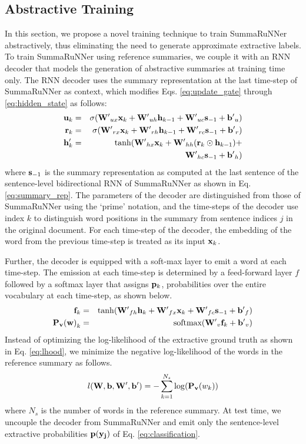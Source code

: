 \documentclass[letterpaper]{article}
\begin{document}
\subsection{\bf Abstractive Training}\label{sec:abstractive_training}
In this section, we propose a novel training technique to train SummaRuNNer abstractively, thus eliminating the need to generate approximate extractive labels. To train SummaRuNNer using reference summaries, we couple it with an RNN decoder that models the generation of abstractive summaries at training time only. The RNN decoder uses the summary representation at the last time-step of SummaRuNNer as context, which modifies Eqs. \ref{eq:update_gate} through \ref{eq:hidden_state} as follows:
\begin{eqnarray}
{\bf u}_k &=&  \sigma({\bf W'}_{ux}{\bf x}_k + {\bf W'}_{uh} {\bf h}_{k-1} + {\bf W'}_{uc}{\bf s}_{-1} + {\bf b'}_u) \nonumber\\
{\bf r}_k &=&  \sigma({\bf W'}_{rx}{\bf x}_k + {\bf W'}_{rh} {\bf h}_{k-1} + {\bf W'}_{rc}{\bf s}_{-1} + {\bf b'}_r) \nonumber\\
{\bf h}'_k &=& \tanh({\bf W'}_{hx}{\bf x}_k + {\bf W'}_{hh} ({\bf r}_k \odot {\bf h}_{k-1}) + \nonumber\\
 && {\bf W'}_{hc}{\bf s}_{-1} + {\bf b'}_h)\nonumber
\end{eqnarray}
where ${\bf s}_{-1}$ is the summary representation as computed at the last sentence of the sentence-level bidirectional RNN of SummaRuNNer as shown in Eq. \ref{eq:summary_rep}. The parameters of the decoder are distinguished from those of SummaRuNNer using the `prime' notation, and the time-steps of the decoder use index $k$ to distinguish word positions in the summary from sentence indices $j$ in the original document. For each time-step of the decoder, the embedding of the word from the previous time-step is treated as its input ${\bf x}_k$.

Further, the decoder is equipped with a soft-max layer to emit a word at each time-step. The emission at each time-step is determined by a feed-forward layer $f$ followed by a softmax layer that assigns ${\bf p}_k$, probabilities over the entire vocabulary at each time-step, as shown below.
\begin{eqnarray}
{\bf f}_k &=& \tanh({\bf W'}_{fh}{\bf h}_k + {\bf W'}_{fx}{\bf x}_k + {\bf W'}_{fc}{\bf s}_{-1}+ {\bf b'}_f) \nonumber\\
{\bf P_v(w)}_k &=& \mbox{softmax}({\bf W'}_v{\bf f}_k + {\bf b'}_v) \nonumber
\end{eqnarray}
Instead of optimizing the log-likelihood of the extractive ground truth as shown in Eq. \ref{eq:lhood}, we minimize the negative log-likelihood of the words in the reference summary as follows.
\begin{equation}
l({\bf W}, {\bf b}, {\bf W'}, {\bf b'}) = -\sum_{k=1}^{N_s} \log ({\bf P_v}(w_k))
\end{equation}
where $N_s$ is the number of words in the reference summary. At test time, we uncouple the decoder from SummaRuNNer and emit only the sentence-level extractive probabilities ${\bf p(y_j)}$ of Eq. \ref{eq:classification}. 
\end{document}
